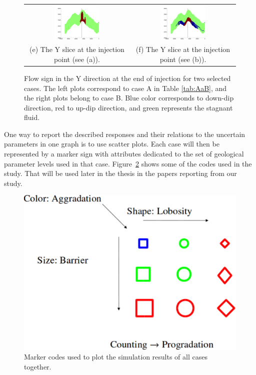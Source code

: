 \begin{figure}
\begin{tabular}{cc}
\includegraphics[width=0.45\textwidth]{./figurer/C02222_FlowSign_slcy}&
\includegraphics[width=0.45\textwidth]{./figurer/C03211_FlowSign_slcy}
\\(e) The Y slice at the injection point (see (a)).&
(f) The Y slice at the injection point (see (b)).
\end{tabular}
\caption{Flow sign in the Y direction at the end of injection for two selected cases. The left plots correspond to case A in Table \ref{tab:AaB}, and the right plots belong to case B. Blue color corresponds to down-dip direction, red to up-dip direction, and green represents the stagnant fluid.}
\label{fig:FOSEOI}
\end{figure}


One way to report the described responses and their relations to the uncertain
parameters in one graph is to use scatter plots. Each case will then be
represented by a marker sign with attributes dedicated to the set of geological
parameter levels used in that case. Figure~\ref{fig:codes} shows some of the
codes used in the study. That will be used later in the thesis in the papers
reporting from our study.


\begin{figure}
  \centering
  \includegraphics[width=0.65 \linewidth]{./figurer/codes} 
  \caption{Marker codes used to plot the simulation results of all cases
together.}
  \label{fig:codes}
%
\end{figure}

